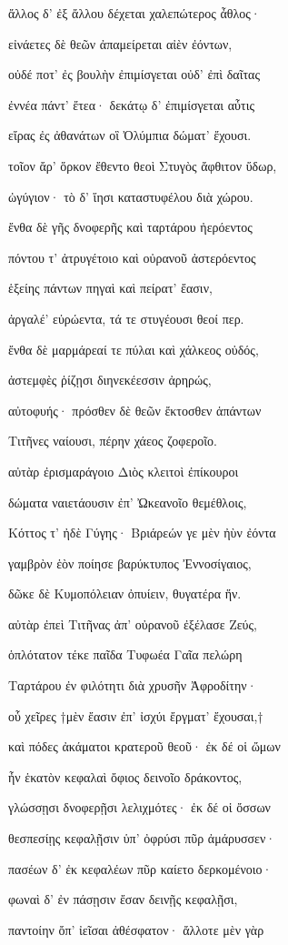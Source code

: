 \begin{pages}
\begin{Leftside}
ἄλλος δ' ἐξ ἄλλου δέχεται χαλεπώτερος ἆθλος·  

εἰνάετες δὲ θεῶν ἀπαμείρεται αἰὲν ἐόντων,

οὐδέ ποτ' ἐς βουλὴν ἐπιμίσγεται οὐδ' ἐπὶ δαῖτας

ἐννέα πάντ' ἔτεα· δεκάτῳ δ' ἐπιμίσγεται αὖτις 

εἴρας ἐς ἀθανάτων οἳ Ὀλύμπια δώματ' ἔχουσι. 

τοῖον ἄρ' ὅρκον ἔθεντο θεοὶ Στυγὸς ἄφθιτον ὕδωρ,  

ὠγύγιον· τὸ δ' ἵησι καταστυφέλου διὰ χώρου. 

ἔνθα δὲ γῆς δνοφερῆς καὶ ταρτάρου ἠερόεντος 

πόντου τ' ἀτρυγέτοιο καὶ οὐρανοῦ ἀστερόεντος

ἑξείης πάντων πηγαὶ καὶ πείρατ' ἔασιν, 

ἀργαλέ' εὐρώεντα, τά τε στυγέουσι θεοί περ. 

ἔνθα δὲ μαρμάρεαί τε πύλαι καὶ χάλκεος οὐδός, 

ἀστεμφὲς ῥίζῃσι διηνεκέεσσιν ἀρηρώς, 

αὐτοφυής· πρόσθεν δὲ θεῶν ἔκτοσθεν ἁπάντων 

Τιτῆνες ναίουσι, πέρην χάεος ζοφεροῖο. 

αὐτὰρ ἐρισμαράγοιο Διὸς κλειτοὶ ἐπίκουροι 

δώματα ναιετάουσιν ἐπ' Ὠκεανοῖο θεμέθλοις,

Κόττος τ' ἠδὲ Γύγης· Βριάρεών γε μὲν ἠὺν ἐόντα 

γαμβρὸν ἑὸν ποίησε βαρύκτυπος Ἐννοσίγαιος,

δῶκε δὲ Κυμοπόλειαν ὀπυίειν, θυγατέρα ἥν.

αὐτὰρ ἐπεὶ Τιτῆνας ἀπ' οὐρανοῦ ἐξέλασε Ζεύς,  

ὁπλότατον τέκε παῖδα Τυφωέα Γαῖα πελώρη

Ταρτάρου ἐν φιλότητι διὰ χρυσῆν Ἀφροδίτην· 

οὗ χεῖρες †μὲν ἔασιν ἐπ' ἰσχύι ἔργματ' ἔχουσαι,†

καὶ πόδες ἀκάματοι κρατεροῦ θεοῦ· ἐκ δέ οἱ ὤμων 

ἦν ἑκατὸν κεφαλαὶ ὄφιος δεινοῖο δράκοντος,  

γλώσσῃσι δνοφερῇσι λελιχμότες· ἐκ δέ οἱ ὄσσων 

θεσπεσίῃς κεφαλῇσιν ὑπ' ὀφρύσι πῦρ ἀμάρυσσεν· 

πασέων δ' ἐκ κεφαλέων πῦρ καίετο δερκομένοιο· 

φωναὶ δ' ἐν πάσῃσιν ἔσαν δεινῇς κεφαλῇσι,

παντοίην ὄπ' ἰεῖσαι ἀθέσφατον· ἄλλοτε μὲν γὰρ  


\end{Leftside}
\end{pages}
